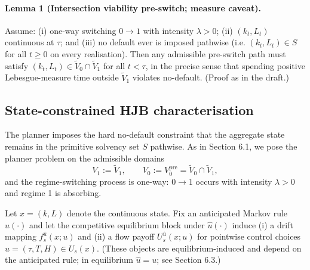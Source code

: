 \documentclass{article}
\begin{document}
\paragraph{Lemma 1 (Intersection viability pre-switch; measure caveat).}
Assume: (i) one-way switching $0\to 1$ with intensity $\lambda>0$; (ii) $(k_t,L_t)$ continuous at $\tau$; and (iii) no default
ever is imposed pathwise (i.e. $(k_t,L_t)\in S$ for all $t\ge 0$ on every realisation). Then any admissible pre-switch path must
satisfy $(k_t,L_t)\in \widetilde V_0\cap \widetilde V_1$ for all $t<\tau$, in the precise sense that spending positive Lebesgue-measure
time outside $\widetilde V_1$ violates no-default. (Proof as in the draft.)

\subsection{State-constrained HJB characterisation}

The planner imposes the hard no-default constraint that the aggregate state remains in the primitive solvency set $S$
pathwise. As in Section 6.1, we pose the planner problem on the admissible domains
\[
V_1:=\widetilde V_1,\qquad V_0:=V_0^{\mathrm{pre}}=\widetilde V_0\cap \widetilde V_1,
\]
and the regime-switching process is one-way: $0\to 1$ occurs with intensity $\lambda>0$ and regime 1 is absorbing.

Let $x=(k,L)$ denote the continuous state. Fix an anticipated Markov rule $\hat u(\cdot)$ and let the competitive equilibrium
block under $\hat u(\cdot)$ induce (i) a drift mapping $f_s^{\hat u}(x;u)$ and (ii) a flow payoff $U_s^{\hat u}(x;u)$ for
pointwise control choices $u=(\tau,T,H)\in U_s(x)$. (These objects are equilibrium-induced and depend on the anticipated rule;
in equilibrium $\hat u=u$; see Section 6.3.)
\end{document}
